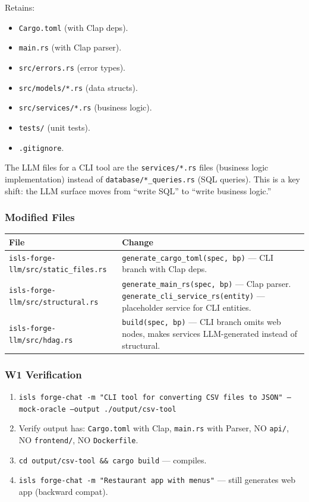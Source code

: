 \documentclass[11pt,a4paper]{article}
\begin{document}
Retains:
\begin{itemize}[nosep]
\item \texttt{Cargo.toml} (with Clap deps).
\item \texttt{main.rs} (with Clap parser).
\item \texttt{src/errors.rs} (error types).
\item \texttt{src/models/*.rs} (data structs).
\item \texttt{src/services/*.rs} (business logic).
\item \texttt{tests/} (unit tests).
\item \texttt{.gitignore}.
\end{itemize}

The LLM files for a CLI tool are the \texttt{services/*.rs} files 
(business logic implementation) instead of \texttt{database/*\_queries.rs} 
(SQL queries). This is a key shift: the LLM surface moves from 
``write SQL'' to ``write business logic.''

\subsubsection{Modified Files}

\begin{longtable}{lp{10cm}}
\toprule
\textbf{File} & \textbf{Change} \\
\midrule
\texttt{isls-forge-llm/src/static\_files.rs}
  & \texttt{generate\_cargo\_toml(spec, bp)} --- CLI branch with 
    Clap deps. \\
\texttt{isls-forge-llm/src/structural.rs}
  & \texttt{generate\_main\_rs(spec, bp)} --- Clap parser. 
    \texttt{generate\_cli\_service\_rs(entity)} --- placeholder 
    service for CLI entities. \\
\texttt{isls-forge-llm/src/hdag.rs}
  & \texttt{build(spec, bp)} --- CLI branch omits web nodes, 
    makes services LLM-generated instead of structural. \\
\bottomrule
\end{longtable}

\subsubsection{W1 Verification}

\begin{enumerate}[nosep]
\item \texttt{isls forge-chat -m "CLI tool for converting CSV 
      files to JSON" --mock-oracle --output ./output/csv-tool}
\item Verify output has: \texttt{Cargo.toml} with Clap, 
      \texttt{main.rs} with Parser, NO \texttt{api/}, NO 
      \texttt{frontend/}, NO \texttt{Dockerfile}.
\item \texttt{cd output/csv-tool \&\& cargo build} --- compiles.
\item \texttt{isls forge-chat -m "Restaurant app with menus"} --- 
      still generates web app (backward compat).
\end{enumerate}
\end{document}
